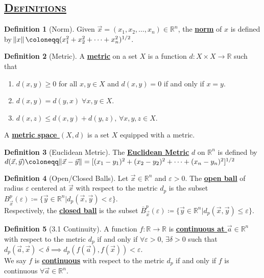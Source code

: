 \documentclass{article}
\newcommand{\R}{\ensuremath{\mathbb{R}}}
\newcommand{\Iff}{if and only if}
\newcommand{\coleq}{\ensuremath{\coloneqq}}
\newcommand{\define}[1]{\textbf{\underline{#1}}}
\newcommand{\func}[3]{\ensuremath{#1: #2 \to #3}}
\newcommand{\ball}[3]{\ensuremath{B_{#1}^{#2}(#3)}}
\newcommand{\Ball}[3]{\ensuremath{\overline{B}_{#1}^{#2}(#3)}}
\theoremstyle{definition}
\newtheorem*{defn}{Definition}
\theoremstyle{remark}
\begin{document}
    \subsection*{\underline{\textsc{Definitions}}}{
        \begin{defn}[Norm]
            Given $\Vec{x}=(x_1,x_2,\ldots,x_n) \in \R^n$, the \define{norm} of $x$ is defined by $\norm{x}\coleq(x_1^2+x_2^2+\cdots+x_n^2)^{1/2}$.
        \end{defn}
        
        \begin{defn}[Metric]
            A \define{metric} on a set $X$ is a function $d:X\times X \to \R$ such that
            \begin{enumerate}
                \item $d(x,y) \geq 0$ for all $x,y \in X$ and $d(x,y)=0$ \Iff{} $x=y$.
                \item $d(x,y)=d(y,x) \; \forall x,y\in X$.
                \item $d(x,z)\leq d(x,y)+d(y,z), \, \forall x,y,z \in X$.
            \end{enumerate}
            A \define{metric space $(X,d)$} is a set $X$ equipped with a metric.
        \end{defn}
        
        \begin{defn}[Euclidean Metric]
            The \define{Euclidean Metric} $d$ on $\R^n$ is defined by\\ $d(\Vec{x},\Vec{y})\coleq\norm{\Vec{x}-\Vec{y}}=[(x_1-y_1)^2+(x_2-y_2)^2+\cdots+(x_n-y_n)^2]^{1/2}$
        \end{defn}
        
        \begin{defn}[Open/Closed Balls]
            Let $\Vec{x} \in \R^n$ and $\varepsilon > 0$. The \define{open ball} of radius $\varepsilon$ centered at $\Vec{x}$ with respect to the metric $d_p$ is the subset $\ball{\Vec{x}}{p}{\varepsilon} \coleq \{\Vec{y} \in \R^n|d_p(\Vec{x},\Vec{y}) < \varepsilon\}$.\\
            Respectively, the \define{closed ball} is the subset $\Ball{\Vec{x}}{p}{\varepsilon} \coleq \{\Vec{y} \in \R^n|d_p(\Vec{x},\Vec{y}) \leq \varepsilon\}$.
        \end{defn}
        
        \begin{defn}[3.1 Continuity]
            A function $\func{f}{\R}{\R}$ is \define{continuous at $\Vec{a} \in \R^n$} with respect to the metric $d_p$ \Iff{} $\forall \varepsilon>0, \, \exists \delta>0$ such that $d_p(\Vec{a},\Vec{x})<\delta \implies d_p(f(\Vec{a}),f(\Vec{x}))<\varepsilon$.\\
            We say $f$ is \define{continuous} with respect to the metric $d_p$ \Iff{} $f$ is continuous $\forall \Vec{a} \in \R^n$.
        \end{defn}
        
}
\end{document}
